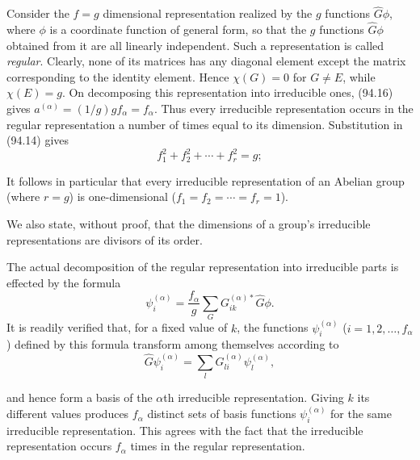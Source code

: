 Consider the $f=g$ dimensional representation realized by the $g$ functions $\widehat G\phi$, where $\phi$ is a coordinate function of general form, so that the $g$ functions $\widehat G\phi$ obtained from it are all linearly independent. Such a representation is called \emph{regular}. Clearly, none of its matrices has any diagonal element except the matrix corresponding to the identity element. Hence $\chi(G)=0$ for $G\ne E$, while $\chi(E)=g$. On decomposing this representation into irreducible ones, (94.16) gives $a^{(\alpha)}=(1/g)gf_\alpha=f_\alpha$. Thus every irreducible representation occurs in the regular representation a number of times equal to its dimension. Substitution in (94.14) gives
\begin{equation}
 f_1^2+f_2^2+\cdots+f_r^2=g;
 \tag{94.17}
\end{equation}


It follows in particular that every irreducible representation of an Abelian group (where $r=g$) is one-dimensional ($f_1=f_2=\cdots=f_r=1$).

We also state, without proof, that the dimensions of a group's irreducible representations are divisors of its order.

The actual decomposition of the regular representation into irreducible parts is effected by the formula
\begin{equation}
 \psi_i^{(\alpha)}=\frac{f_\alpha}{g}\sum_GG_{ik}^{(\alpha)*}\widehat G\phi.
 \tag{94.18}
\end{equation}
It is readily verified that, for a fixed value of $k$, the functions $\psi_i^{(\alpha)}$ ($i=1,2,\ldots,f_\alpha$) defined by this formula transform among themselves according to
\[
 \widehat G\psi_i^{(\alpha)}=\sum_lG_{li}^{(\alpha)}\psi_l^{(\alpha)},
\]

and hence form a basis of the $\alpha$th irreducible representation. Giving $k$ its different values produces $f_\alpha$ distinct sets of basis functions $\psi_i^{(\alpha)}$ for the same irreducible representation. This agrees with the fact that the irreducible representation occurs $f_\alpha$ times in the regular representation.

